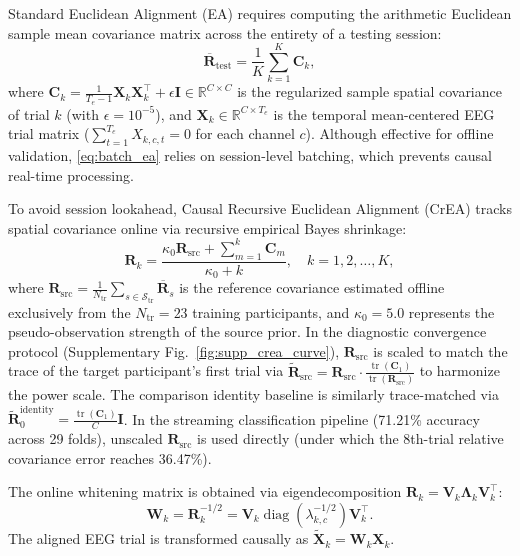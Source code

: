 \documentclass[journal]{IEEEtran}
\begin{document}
Standard Euclidean Alignment (EA) requires computing the arithmetic Euclidean sample mean covariance matrix across the entirety of a testing session:
\begin{equation}
\overline{\mathbf{R}}_{\mathrm{test}} = \frac{1}{K} \sum_{k=1}^K \mathbf{C}_k,
\label{eq:batch_ea}
\end{equation}
where $\mathbf{C}_k = \frac{1}{T_e - 1} \mathbf{X}_k \mathbf{X}_k^\top + \epsilon \mathbf{I} \in \mathbb{R}^{C \times C}$ is the regularized sample spatial covariance of trial $k$ (with $\epsilon = 10^{-5}$), and $\mathbf{X}_k \in \mathbb{R}^{C \times T_e}$ is the temporal mean-centered EEG trial matrix ($\sum_{t=1}^{T_e} X_{k,c,t} = 0$ for each channel $c$). Although effective for offline validation, \eqref{eq:batch_ea} relies on session-level batching, which prevents causal real-time processing.

To avoid session lookahead, Causal Recursive Euclidean Alignment (CrEA) tracks spatial covariance online via recursive empirical Bayes shrinkage:
\begin{equation}
\mathbf{R}_k = \frac{\kappa_0 \mathbf{R}_{\mathrm{src}} + \sum_{m=1}^k \mathbf{C}_m}{\kappa_0 + k}, \quad k = 1, 2, \dots, K,
\label{eq:supp_crea}
\end{equation}
where $\mathbf{R}_{\mathrm{src}} = \frac{1}{N_{\mathrm{tr}}} \sum_{s \in \mathcal{S}_{\mathrm{tr}}} \overline{\mathbf{R}}_s$ is the reference covariance estimated offline exclusively from the $N_{\mathrm{tr}} = 23$ training participants, and $\kappa_0 = 5.0$ represents the pseudo-observation strength of the source prior. In the diagnostic convergence protocol (Supplementary Fig.~\ref{fig:supp_crea_curve}), $\mathbf{R}_{\mathrm{src}}$ is scaled to match the trace of the target participant's first trial via $\widetilde{\mathbf{R}}_{\mathrm{src}} = \mathbf{R}_{\mathrm{src}} \cdot \frac{\operatorname{tr}(\mathbf{C}_1)}{\operatorname{tr}(\mathbf{R}_{\mathrm{src}})}$ to harmonize the power scale. The comparison identity baseline is similarly trace-matched via $\widetilde{\mathbf{R}}_0^{\mathrm{identity}} = \frac{\operatorname{tr}(\mathbf{C}_1)}{C} \mathbf{I}$. In the streaming classification pipeline (71.21\% accuracy across 29 folds), unscaled $\mathbf{R}_{\mathrm{src}}$ is used directly (under which the 8th-trial relative covariance error reaches 36.47\%).

The online whitening matrix is obtained via eigendecomposition $\mathbf{R}_k = \mathbf{V}_k \boldsymbol{\Lambda}_k \mathbf{V}_k^\top$:
\begin{equation}
\mathbf{W}_k = \mathbf{R}_k^{-1/2} = \mathbf{V}_k \operatorname{diag}\left(\lambda_{k,c}^{-1/2}\right) \mathbf{V}_k^\top.
\label{eq:whitening}
\end{equation}
The aligned EEG trial is transformed causally as $\widetilde{\mathbf{X}}_k = \mathbf{W}_k \mathbf{X}_k$.
\end{document}
